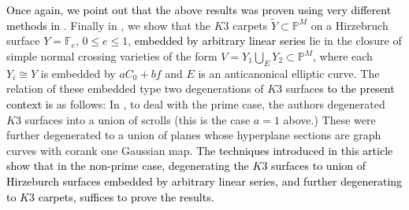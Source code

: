\documentclass[11pt,twoside]{amsart}
\theoremstyle{plain}
\numberwithin{equation}{section}
\theoremstyle{definition}
\newtheorem{definition}[theorem]{Definition}
\begin{document}
\textcolor{black}{Once again, we point out that the above results was proven using very different methods in \cite{CLM98}}.
Finally in , we show that the $K3$ carpets $\widetilde{Y} \subset \mathbb{P}^M$ %
on a Hirzebruch surface $Y=\mathbb{F}_e$, $0 \leq e \leq 1$, \textcolor{black}{embedded by arbitrary linear series} 
lie in the closure of simple normal crossing varieties of the form $V = Y_1 \bigcup_E Y_2 \subset \mathbb{P}^M$, where each $Y_i \cong Y$ is embedded by $aC_0+bf$ and $E$ is an anticanonical elliptic curve.  The relation of these embedded type two degenerations of $K3$ surfaces \textcolor{black}{to the present context is} as follows: In \cite{CLM93}, to deal with the prime case, the authors degenerated $K3$ surfaces into a union of scrolls (this is the case $a=1$ above.) These were further degenerated to a union of planes whose hyperplane sections are graph curves with corank one Gaussian map. \textcolor{black}{The techniques introduced in this article show that in the non-prime case, degenerating the $K3$ surfaces to union of Hirzeburch surfaces embedded by arbitrary linear series, and further degenerating to $K3$ carpets, suffices to prove the results.} %


\end{document}
